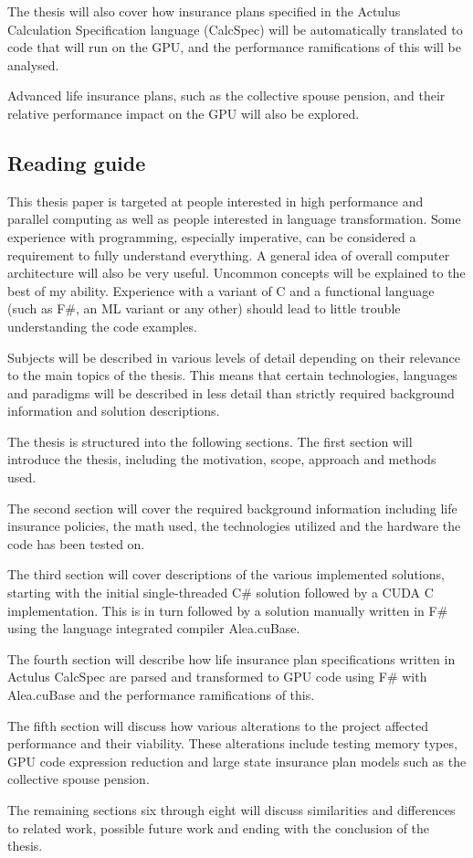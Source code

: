 The thesis will also cover how insurance plans specified in the Actulus Calculation Specification language (CalcSpec) will be automatically translated to code that will run on the GPU, and the performance ramifications of this will be analysed.

Advanced life insurance plans, such as the collective spouse pension, and their relative performance impact on the GPU will also be explored.

\subsection{Reading guide}
This thesis paper is targeted at people interested in high performance and parallel computing as well as people interested in language transformation. 
Some experience with programming, especially imperative, can be considered a requirement to fully understand everything. 
A general idea of overall computer architecture will also be very useful. 
Uncommon concepts will be explained to the best of my ability. 
Experience with a variant of C and a functional language (such as F\#, an ML variant or any other) should lead to little trouble understanding the code examples.

Subjects will be described in various levels of detail depending on their relevance to the main topics of the thesis.
This means that certain technologies, languages and paradigms will be described in less detail than strictly required background information and solution descriptions.

The thesis is structured into the following sections.
The first section will introduce the thesis, including the motivation, scope, approach and methods used.

The second section will cover the required background information including life insurance policies, the math used, the technologies utilized and the hardware the code has been tested on.

The third section will cover descriptions of the various implemented solutions, starting with the initial single-threaded C\# solution followed by a CUDA C implementation. 
This is in turn followed by a solution manually written in F\# using the language integrated compiler Alea.cuBase.

The fourth section will describe how life insurance plan specifications written in Actulus CalcSpec are parsed and transformed to GPU code using F\# with Alea.cuBase and the performance ramifications of this.

The fifth section will discuss how various alterations to the project affected performance and their viability. 
These alterations include testing memory types, GPU code expression reduction and large state insurance plan models such as the collective spouse pension.

The remaining sections six through eight will discuss similarities and differences to related work, possible future work and ending with the conclusion of the thesis.